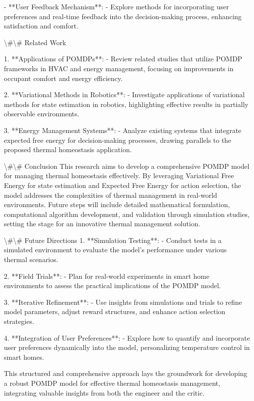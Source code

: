\documentclass[11pt,a4paper]{article}
\begin{document}
- **User Feedback Mechanism**: 
   - Explore methods for incorporating user preferences and real-time feedback into the decision-making process, enhancing satisfaction and comfort.

\textbackslash{}#\textbackslash{}# Related Work

1. **Applications of POMDPs**: 
   - Review related studies that utilize POMDP frameworks in HVAC and energy management, focusing on improvements in occupant comfort and energy efficiency.

2. **Variational Methods in Robotics**: 
   - Investigate applications of variational methods for state estimation in robotics, highlighting effective results in partially observable environments.

3. **Energy Management Systems**: 
   - Analyze existing systems that integrate expected free energy for decision-making processes, drawing parallels to the proposed thermal homeostasis application.

\textbackslash{}#\textbackslash{}# Conclusion
This research aims to develop a comprehensive POMDP model for managing thermal homeostasis effectively. By leveraging Variational Free Energy for state estimation and Expected Free Energy for action selection, the model addresses the complexities of thermal management in real-world environments. Future steps will include detailed mathematical formulation, computational algorithm development, and validation through simulation studies, setting the stage for an innovative thermal management solution.

\textbackslash{}#\textbackslash{}# Future Directions
1. **Simulation Testing**: 
   - Conduct tests in a simulated environment to evaluate the model's performance under various thermal scenarios.

2. **Field Trials**: 
   - Plan for real-world experiments in smart home environments to assess the practical implications of the POMDP model.

3. **Iterative Refinement**: 
   - Use insights from simulations and trials to refine model parameters, adjust reward structures, and enhance action selection strategies.

4. **Integration of User Preferences**: 
   - Explore how to quantify and incorporate user preferences dynamically into the model, personalizing temperature control in smart homes.

This structured and comprehensive approach lays the groundwork for developing a robust POMDP model for effective thermal homeostasis management, integrating valuable insights from both the engineer and the critic. 
\end{document}
